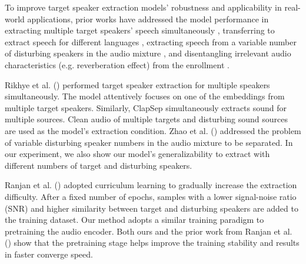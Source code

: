 To improve target speaker extraction models' robustness and applicability in real-world applications, prior works have addressed the model performance in extracting multiple target speakers' speech simultaneously \cite{rikhye2021multiuservoicefilter, ma2024clapsep, zeng2023simultaneousspeech}, transferring to extract speech for different languages \cite{pham2024wannahearvoiceadaptive}, extracting speech from a variable number of disturbing speakers in the audio mixture \cite{zhao2024continuoustargetspeech}, and disentangling irrelevant audio characteristics (e.g. reverberation effect) from the enrollment \cite{liu2024tsecurriculum, Ranjan2018CurriculumLearning, Heo2024CentroidEstimation, pandey2023AttentiveTraining, borsdorf2024wTIMIT2mix, mu2024selfsuperviseddisentangle, luo2024disentangleinstrument}.

Rikhye et al. (\citeyear{rikhye2021multiuservoicefilter}) performed target speaker extraction for multiple speakers simultaneously. The model attentively focuses on one of the embeddings from multiple target speakers. Similarly, ClapSep \cite{ma2024clapsep} simultaneously extracts sound for multiple sources. Clean audio of multiple targets and disturbing sound sources are used as the model's extraction condition. Zhao et al. (\citeyear{zhao2024continuoustargetspeech}) addressed the problem of variable disturbing speaker numbers in the audio mixture to be separated. In our experiment, we also show our model's generalizability to extract with different numbers of target and disturbing speakers. 

Ranjan et al. (\citeyear{Ranjan2018CurriculumLearning}) adopted curriculum learning to gradually increase the extraction difficulty. After a fixed number of epochs, samples with a lower signal-noise ratio (SNR) and higher similarity between target and disturbing speakers are added to the training dataset. Our method adopts a similar training paradigm to pretraining the audio encoder. Both ours and the prior work from Ranjan et al. (\citeyear{Ranjan2018CurriculumLearning}) show that the pretraining stage helps improve the training stability and results in faster converge speed.




